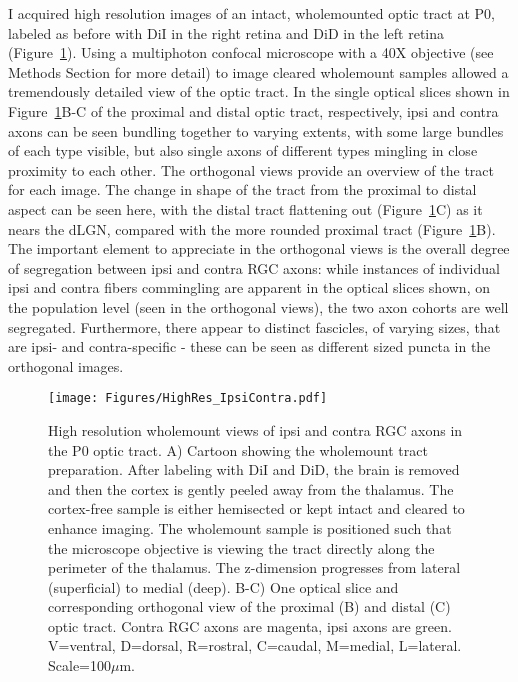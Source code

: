 I acquired high resolution images of an intact, wholemounted optic tract at P0, labeled as before with DiI in the right retina and DiD in the left retina (Figure~\ref{Figures/HighResIpsiContra}).
Using a multiphoton confocal microscope with a 40X objective (see Methods Section for more detail) to image cleared wholemount samples allowed a tremendously detailed view of the optic tract.
In the single optical slices shown in Figure~\ref{Figures/HighResIpsiContra}B-C of the proximal and distal optic tract, respectively, ipsi and contra axons can be seen bundling together to varying extents, with some large bundles of each type visible, but also single axons of different types mingling in close proximity to each other.
The orthogonal views provide an overview of the tract for each image.
The change in shape of the tract from the proximal to distal aspect can be seen here, with the distal tract flattening out (Figure~\ref{Figures/HighResIpsiContra}C) as it nears the dLGN, compared with the more rounded proximal tract (Figure~\ref{Figures/HighResIpsiContra}B).
The important element to appreciate in the orthogonal views is the overall degree of segregation between ipsi and contra RGC axons: while instances of individual ipsi and contra fibers commingling are apparent in the optical slices shown, on the population level (seen in the orthogonal views), the two axon cohorts are well segregated.
Furthermore, there appear to distinct fascicles, of varying sizes, that are ipsi- and contra-specific - these can be seen as different sized puncta in the orthogonal images.
\begin{figure}[hbtp]
    \begin{center}
        \texttt{[image: Figures/HighRes\_IpsiContra.pdf]}
        \caption[High resolution wholemount views of ipsi and contra RGC axons in the P0 optic tract.]
        {High resolution wholemount views of ipsi and contra RGC axons in the P0 optic tract.
        A) Cartoon showing the wholemount tract preparation.
        After labeling with DiI and DiD, the brain is removed and then the cortex is gently peeled away from the thalamus.
        The cortex-free sample is either hemisected or kept intact and cleared to enhance imaging.
        The wholemount sample is positioned such that the microscope objective is viewing the tract directly along the perimeter of the thalamus.
        The z-dimension progresses from lateral (superficial) to medial (deep).
        B-C) One optical slice and corresponding orthogonal view of the proximal (B) and distal (C) optic tract.
        Contra RGC axons are magenta, ipsi axons are green.
        V=ventral, D=dorsal, R=rostral, C=caudal, M=medial, L=lateral.
        Scale=100$\mu$m.
        }
        \label{Figures/HighResIpsiContra}
    \end{center}
\end{figure}

